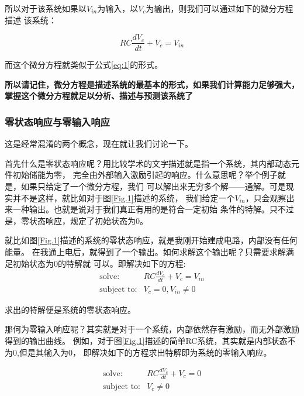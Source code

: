 \documentclass{ctexart}
\begin{document}
所以对于该系统如果以$V_{in}$为输入，以$V_c$为输出，则我们可以通过如下的微分方程描述
该系统：

\begin{equation}
    RC \frac{d V_c}{d t} + V_c = V_{in}
    \label{eq:3}
\end{equation}

而这个微分方程就类似于公式\eqref{eq:1}的形式。

\textbf{所以请记住，微分方程是描述系统的最基本的形式，如果我们计算能力足够强大，
    掌握这个微分方程就足以分析、描述与预测该系统了}

\subsubsection*{零状态响应与零输入响应}
这是经常混淆的两个概念，现在就让我们讨论一下。

首先什么是零状态响应呢？用比较学术的文字描述就是指一个系统，其内部动态元件初始储能为零，
完全由外部输入激励引起的响应。什么意思呢？举个例子就是，如果只给定了一个微分方程，我们
可以解出来无穷多个解——通解。可是现实并不是这样，就比如对于图\ref{Fig.1}描述的系统，
我们给定一个$V_{in}$，只会观察出来一种输出。也就是说对于我们真正有用的是符合一定初始
条件的特解。只不过是，零状态响应，规定了初始状态为0。

就比如图\ref{Fig.1}描述的系统的零状态响应，就是我刚开始建成电路，内部没有任何能量。
在我通上电后，就得到了一个输出。如何求解这个输出呢？只需要求解满足初始状态为0的特解就
可以。即解决如下的方程:
\begin{equation}
    \begin{array}{rl}
        \text{solve:}      & RC \frac{d V_c}{d t} + V_c = V_{in} \\
        \text{subject to:} & V_c = 0, V_{in} \neq 0
    \end{array}
    \label{eq:4}
\end{equation}

求出的特解便是系统的零状态响应。

那何为零输入响应呢？其实就是对于一个系统，内部依然存有激励，而无外部激励得到的输出曲线。
例如，对于图\ref{Fig.1}描述的简单RC系统，其实就是内部状态不为0,但是其输入为0，
即解决如下的方程求出特解即为系统的零输入响应。

\begin{equation}
    \begin{array}{rl}
        \text{solve:}      & RC \frac{d V_c}{d t} + V_c = 0 \\
        \text{subject to:} & V_c \neq 0
    \end{array}
    \label{eq:5}
\end{equation}
\end{document}
